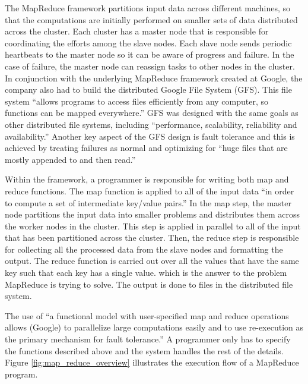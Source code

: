 \documentclass{book}
\begin{document}
The MapReduce framework partitions input data across different machines, so
that the computations are initially performed on smaller sets of data
distributed across the cluster. Each cluster has a master node that is
responsible for coordinating the efforts among the slave nodes. Each slave node
sends periodic heartbeats to the master node so it can be aware of progress and
failure. In the case of failure, the master node can reassign tasks to other
nodes in the cluster. In conjunction with the underlying MapReduce framework
created at Google, the company also had to build the distributed Google File
System (GFS). This file system ``allows programs to access files efficiently
from any computer, so functions can be mapped
everywhere.''\cite{patterson:2008} GFS was designed with the same goals as
other distributed file systems, including ``performance, scalability,
reliability and availability.''\cite{ghemawat:2003} Another key aspect of the
GFS design is fault tolerance and this is achieved by treating failures as
normal and optimizing for ``huge files that are mostly appended to and then
read.''\cite{ghemawat:2003}

Within the framework, a programmer is responsible for writing both map and
reduce functions. The map function is applied to all of the input data ``in
order to compute a set of intermediate key/value pairs.''\cite{dean:2004} In
the map step, the master node partitions the input data into smaller problems
and distributes them across the worker nodes in the cluster. This step is
applied in parallel to all of the input that has been partitioned across the
cluster. Then, the reduce step is responsible for collecting all the processed
data from the slave nodes and formatting the output. The reduce function is
carried out over all the values that have the same key such that each key has a
single value. which is the answer to the problem MapReduce is trying to solve.
The output is done to files in the distributed file system.

The use of ``a functional model with user-specified map and reduce operations
allows (Google) to parallelize large computations easily and to use
re-execution as the primary mechanism for fault tolerance.''\cite{dean:2004} A
programmer only has to specify the functions described above and the system
handles the rest of the details. Figure \ref{fig:map_reduce_overview}
illustrates the execution flow of a MapReduce program.
\end{document}
